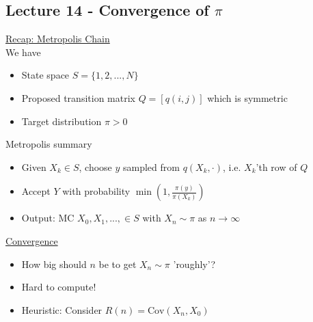 \documentclass[12pt, letterpaper]{article}
\begin{document}
\subsection{Lecture 14 - Convergence of $\pi$}
\underline{Recap: Metropolis Chain} \\
We have 
\begin{itemize}
    \item State space $S = \{1,2,...,N\}$
    \item Proposed transition matrix $Q = [q(i,j)]$ which is symmetric
    \item Target distribution $\pi > 0 $
\end{itemize}
Metropolis summary
\begin{itemize}
    \item Given $X_k \in S$, choose $y$ sampled from $q(X_k, \cdot)$, i.e. $X_k$'th 
    row of $Q$
    \item Accept $Y$ with probability $\min(1, \frac{\pi(y)}{\pi(X_k)})$
    \item Output: MC $X_0, X_1, ..., \in S$ with $X_n \sim \pi$ as $n \rightarrow \infty$
\end{itemize}

\noindent \underline{Convergence}
\begin{itemize}
    \item How big should $n$ be to get $X_n \sim \pi$ 'roughly'?
    \item Hard to compute!
    \item Heuristic: Consider $R(n) = \text{Cov}(X_n, X_0)$
\end{itemize}
\end{document}
